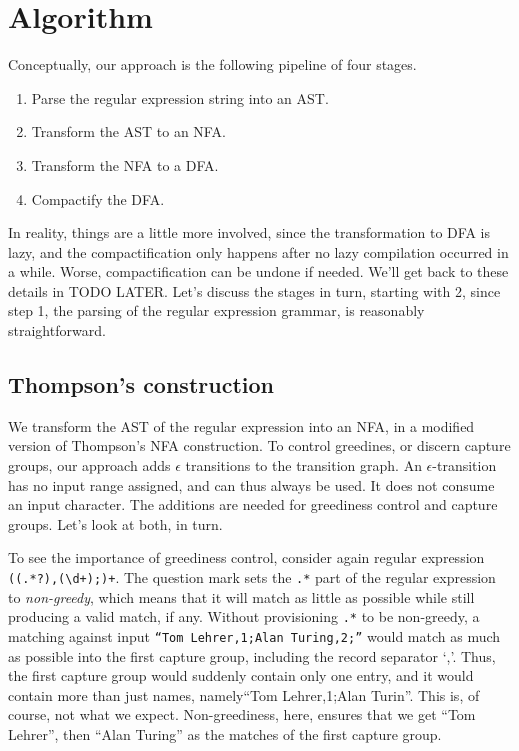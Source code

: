 \documentclass[english]{sigplanconf}
\theoremstyle{definition}
\begin{document}
\section{Algorithm}

Conceptually, our approach is the following pipeline of four stages.
\begin{enumerate}
  \item Parse the regular expression string into an AST.
  \item Transform the AST to an NFA.
  \item Transform the NFA to a DFA.
  \item Compactify the DFA.
\end{enumerate}

In reality, things are a little more involved, since the transformation
to DFA is lazy, and the compactification only happens after no lazy
compilation occurred in a while. Worse, compactification can be
undone if needed. We'll get back to these details in TODO LATER.
Let's discuss the stages in turn, starting with 2, since step 1,
the parsing of the regular expression grammar, is reasonably
straightforward.


\subsection{Thompson's construction} 

We transform the AST of the regular expression into an NFA,
in a modified version of Thompson's NFA construction. To
control greedines, or discern capture groups, our approach adds
$\epsilon$ transitions to the transition graph. An
$\epsilon$-transition has no input range assigned, and can thus always
be used. It does not consume an input character.
The additions are needed for greediness control and capture groups.
Let's look at both, in turn.

To see the importance of greediness control, consider again regular
expression \texttt{((.*?),(\textbackslash{}d+);)+}. The question
mark sets the \texttt{.*} part of the regular expression to
\emph{non-greedy}, which means that it will match as little as
possible while still producing a valid match, if any.  Without
provisioning \texttt{.*} to be non-greedy, a matching against input
\texttt{``Tom Lehrer,1;Alan Turing,2;''} would match as much as
possible into the first capture group, including the record separator
`,'.  Thus, the first capture group would suddenly contain only one
entry, and it would contain more than just names, namely``Tom
Lehrer,1;Alan Turin''.  This is, of course, not what we expect.
Non-greediness, here, ensures that we get ``Tom Lehrer'', then
``Alan Turing'' as the matches of the first capture group.
\end{document}
